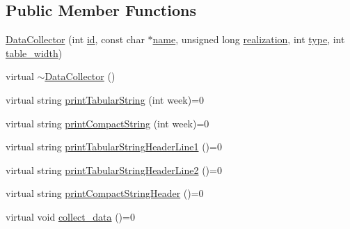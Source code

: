 \subsection*{Public Member Functions}
\begin{DoxyCompactItemize}
\item 
\mbox{\hyperlink{classDataCollector_a3f89b18f4ac0557d7374d49531a004c0_a3f89b18f4ac0557d7374d49531a004c0}{Data\+Collector}} (int \mbox{\hyperlink{classDataCollector_a5cb840b6fbcf6afe364eef9114984383_a5cb840b6fbcf6afe364eef9114984383}{id}}, const char $\ast$\mbox{\hyperlink{classDataCollector_a3a9a5033592f72ada429aa20056162b9_a3a9a5033592f72ada429aa20056162b9}{name}}, unsigned long \mbox{\hyperlink{classDataCollector_a9ef2887466fe3123aa19ef956a219b96_a9ef2887466fe3123aa19ef956a219b96}{realization}}, int \mbox{\hyperlink{classDataCollector_acad1c22d67a8eb3db056ba776a131900_acad1c22d67a8eb3db056ba776a131900}{type}}, int \mbox{\hyperlink{classDataCollector_af46c27a47de92d92dcdae6b26a905a44_af46c27a47de92d92dcdae6b26a905a44}{table\+\_\+width}})
\item 
virtual \mbox{\hyperlink{classDataCollector_a9f9ff1817bd0601ba33925c3378ac50e_a9f9ff1817bd0601ba33925c3378ac50e}{$\sim$\+Data\+Collector}} ()
\item 
virtual string \mbox{\hyperlink{classDataCollector_a397fccabe0223267eea8fc7cac0e59da_a397fccabe0223267eea8fc7cac0e59da}{print\+Tabular\+String}} (int week)=0
\item 
virtual string \mbox{\hyperlink{classDataCollector_a2eac264fa5612aed5a830b12de4f4ae3_a2eac264fa5612aed5a830b12de4f4ae3}{print\+Compact\+String}} (int week)=0
\item 
virtual string \mbox{\hyperlink{classDataCollector_a91619cfa9e9b8cefd2f7c20d5718b41e_a91619cfa9e9b8cefd2f7c20d5718b41e}{print\+Tabular\+String\+Header\+Line1}} ()=0
\item 
virtual string \mbox{\hyperlink{classDataCollector_af01ea961314be2164f39e6d4cd59e443_af01ea961314be2164f39e6d4cd59e443}{print\+Tabular\+String\+Header\+Line2}} ()=0
\item 
virtual string \mbox{\hyperlink{classDataCollector_a98dcb4ec871d9c7fbf7545c64e5ccc67_a98dcb4ec871d9c7fbf7545c64e5ccc67}{print\+Compact\+String\+Header}} ()=0
\item 
virtual void \mbox{\hyperlink{classDataCollector_a01486bf58acbe37b203f97b3b9a79c40_a01486bf58acbe37b203f97b3b9a79c40}{collect\+\_\+data}} ()=0
\end{DoxyCompactItemize}
